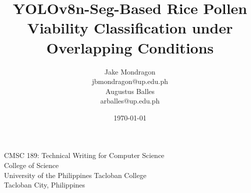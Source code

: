\documentclass[12pt]{article}
\title{YOLOv8n-Seg-Based Rice Pollen Viability Classification under Overlapping Conditions}
\author{
    Jake Mondragon\\
    jbmondragon@up.edu.ph\\[0.25em]
    Augustus Balles\\
    arballes@up.edu.ph
}
\date{\today}
\begin{document}
\hypersetup{pageanchor=false}


\makeatletter
\begin{titlepage}
    \centering
    \thispagestyle{empty}

    \vspace*{1.05in}

    {\LARGE\bfseries \@title\par}

    \vspace{0.4in}

    {\large \@author\par}

    \vspace{0.35in}

    {\large
        CMSC 189: Technical Writing for Computer Science\\
        College of Science\\
        University of the Philippines Tacloban College\\
        Tacloban City, Philippines
        \par
    }

    \vspace{0.4in}

    {\large \@date\par}

\end{titlepage}
\makeatother


\hypersetup{pageanchor=true}
\renewcommand{\contentsname}{CONTENTS}

\tableofcontents
\clearpage











\clearpage
\printbibliography
\end{document}
